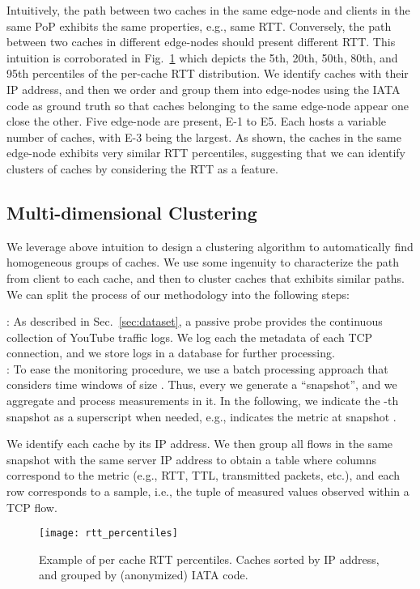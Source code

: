 \documentclass{acm_proc_article-sp}
\newcommand{\node}{{edge-node}\xspace}
\newcommand{\nodes}{{edge-nodes}\xspace}
\begin{document}
Intuitively, the path between two caches in the same \node and clients in the same PoP
exhibits the same properties, e.g., same RTT. Conversely, the path between two caches in different \nodes should present different RTT. This intuition is corroborated in Fig.~\ref{fig:perc1} which depicts the 5th, 20th, 50th, 80th, and 95th percentiles of the per-cache RTT distribution. We identify caches with their IP address, and then we order and group them into \nodes using the IATA code as ground truth so that caches belonging to the same \node appear one close the other. Five \node are present, E-1 to E5. Each hosts a variable number of caches, with E-3 being the largest.
As shown, the caches in the same \node exhibits very similar RTT percentiles, suggesting that we can identify clusters of caches by considering the RTT as a feature.



\subsection{Multi-dimensional Clustering}
\label{sec:clust}

We leverage above intuition to design a clustering algorithm to automatically find homogeneous groups of caches.
We use some ingenuity to characterize the path from client to each cache, and then to cluster caches that exhibits similar paths.
We can split the process of our methodology into the following steps:

:
As described in Sec.~\ref{sec:dataset}, a passive probe provides the continuous collection of YouTube traffic logs. We log each the metadata of each TCP connection, and we store logs in a database for further processing.
\\
:
To ease the monitoring procedure, we use a batch processing approach that considers time windows of size . Thus, every  we generate a ``snapshot'', and we aggregate and process measurements in it. In the following, we indicate the -th snapshot as a superscript when needed, e.g.,  indicates the metric  at snapshot .

We identify each cache  by its IP address. We then group all flows in the same snapshot with the same server IP address to obtain a table where columns correspond to the metric (e.g., RTT, TTL, transmitted packets, etc.),
and each row corresponds to a sample, i.e., the tuple of measured values observed within a TCP flow.
\begin{figure}[t!]
\centering
     \vspace*{-0.1cm}
    \texttt{[image: rtt\_percentiles]}
     \vspace*{-0.5cm}
    \caption{Example of per cache RTT percentiles. Caches sorted by IP address, and grouped by (anonymized) IATA code.}
    \label{fig:perc1}
     \vspace*{-0.3cm}
\end{figure}
\end{document}
